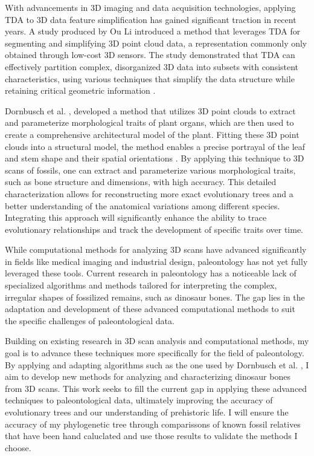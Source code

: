 \documentclass[12pt]{article}
\begin{document}
With advancements in 3D imaging and data acquisition technologies, applying TDA 
to 3D data feature simplification has gained significant
traction in recent years. A study produced by Ou Li \citep{li2021} introduced a 
method that leverages TDA for segmenting and simplifying 3D point cloud data, a
representation commonly only obtained through low-cost 3D sensors. 
The study demonstrated that TDA can effectively partition complex, disorganized 
3D data into subsets with consistent characteristics, using various techniques 
that simplify the data structure while retaining critical geometric information
\citep{li2021}.

Dornbusch et al. \cite{dornbusch2007}, developed a method that utilizes 3D point 
clouds to extract and parameterize morphological traits of plant organs, which 
are then used to create a comprehensive architectural model of the plant. Fitting 
these 3D point clouds into a structural model, the method enables a precise 
portrayal of the leaf and stem shape and their spatial orientations \citep{dornbusch2007}. 
By applying this technique to 3D scans of fossils, one can extract and parameterize 
various morphological traits, such as bone structure and dimensions, with high 
accuracy. This detailed characterization allows for reconstructing more exact
evolutionary trees and a better understanding of the anatomical variations among
different species. Integrating this approach will significantly enhance the
ability to trace evolutionary relationships and track the development of
specific traits over time. 

While computational methods for analyzing 3D scans have advanced significantly
in fields like medical imaging and industrial design, paleontology has not yet
fully leveraged these tools. Current research in paleontology has a noticeable lack of
specialized algorithms and methods tailored for interpreting the complex,
irregular shapes of fossilized remains, such as dinosaur bones. The gap lies in
the adaptation and development of these advanced computational methods to suit
the specific challenges of paleontological data.

Building on existing research in 3D scan analysis and computational methods, my
goal is to advance these techniques more specifically for the field of
paleontology. By applying and adapting algorithms such as the one used by
Dornbusch et al. \citep{dornbusch2007}, I aim to develop new methods for analyzing 
and characterizing dinosaur bones from 3D scans. This work seeks to fill the 
current gap in applying these advanced techniques to paleontological data, 
ultimately improving the accuracy of evolutionary trees and our understanding of 
prehistoric life. I will ensure the accuracy of my phylogenetic tree through
comparissons of known fossil relatives that have been hand caluclated and use
those results to validate the methods I choose.
\end{document}
